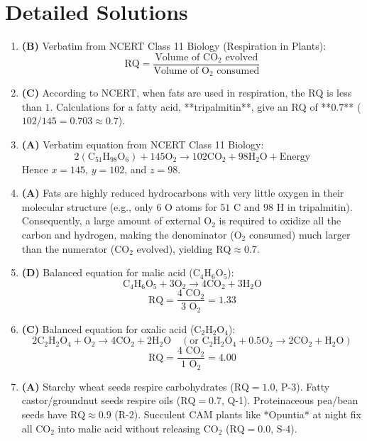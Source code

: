 \documentclass[11pt, a4paper]{article}
\begin{document}
\section*{Detailed Solutions}

\begin{enumerate}[label=\textbf{\arabic*.}]

\item \textbf{(B)} Verbatim from NCERT Class 11 Biology (Respiration in Plants):
$$\text{RQ} = \frac{\text{Volume of } \text{CO}_2 \text{ evolved}}{\text{Volume of } \text{O}_2 \text{ consumed}}$$

\item \textbf{(C)} According to NCERT, when fats are used in respiration, the $\text{RQ}$ is less than $1$. Calculations for a fatty acid, **tripalmitin**, give an $\text{RQ}$ of **$0.7$** ($102 / 145 = 0.703 \approx 0.7$).

\item \textbf{(A)} Verbatim equation from NCERT Class 11 Biology:
$$2(\text{C}_{51}\text{H}_{98}\text{O}_6) + 145\text{O}_2 \longrightarrow 102\text{CO}_2 + 98\text{H}_2\text{O} + \text{Energy}$$
Hence $x = 145$, $y = 102$, and $z = 98$.

\item \textbf{(A)} Fats are highly reduced hydrocarbons with very little oxygen in their molecular structure (e.g., only $6\text{ O}$ atoms for $51\text{ C}$ and $98\text{ H}$ in tripalmitin). Consequently, a large amount of external $\text{O}_2$ is required to oxidize all the carbon and hydrogen, making the denominator ($\text{O}_2$ consumed) much larger than the numerator ($\text{CO}_2$ evolved), yielding $\text{RQ} \approx 0.7$.

\item \textbf{(D)} Balanced equation for malic acid ($\text{C}_4\text{H}_6\text{O}_5$):
$$\text{C}_4\text{H}_6\text{O}_5 + 3\text{O}_2 \longrightarrow 4\text{CO}_2 + 3\text{H}_2\text{O}$$
$$\text{RQ} = \frac{4\text{ CO}_2}{3\text{ O}_2} = \mathbf{1.33}$$

\item \textbf{(C)} Balanced equation for oxalic acid ($\text{C}_2\text{H}_2\text{O}_4$):
$$2\text{C}_2\text{H}_2\text{O}_4 + \text{O}_2 \longrightarrow 4\text{CO}_2 + 2\text{H}_2\text{O} \quad \left(\text{or } \text{C}_2\text{H}_2\text{O}_4 + 0.5\text{O}_2 \longrightarrow 2\text{CO}_2 + \text{H}_2\text{O}\right)$$
$$\text{RQ} = \frac{4\text{ CO}_2}{1\text{ O}_2} = \mathbf{4.00}$$

\item \textbf{(A)} Starchy wheat seeds respire carbohydrates ($\text{RQ} = 1.0$, P-3). Fatty castor/groundnut seeds respire oils ($\text{RQ} = 0.7$, Q-1). Proteinaceous pea/bean seeds have $\text{RQ} \approx 0.9$ (R-2). Succulent CAM plants like *Opuntia* at night fix all $\text{CO}_2$ into malic acid without releasing $\text{CO}_2$ ($\text{RQ} = 0.0$, S-4).


\end{enumerate}
\end{document}
